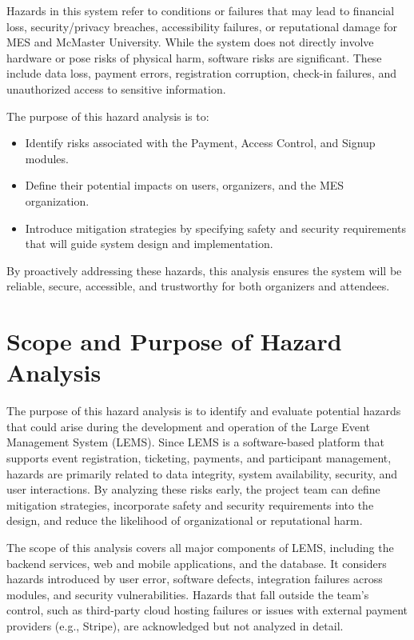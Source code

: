 \documentclass{article}
\begin{document}
\noindent
Hazards in this system refer to conditions or failures that may lead to financial loss, security/privacy breaches,
accessibility failures, or reputational damage for MES and McMaster University. While the system does not directly
involve hardware or pose risks of physical harm, software risks are significant. These include data loss, payment
errors, registration corruption, check-in failures, and unauthorized access to sensitive information.
\newline

\noindent
The purpose of this hazard analysis is to:

\begin{itemize}
    \item Identify risks associated with the Payment, Access Control, and Signup modules.
    \item Define their potential impacts on users, organizers, and the MES organization.
    \item Introduce mitigation strategies by specifying safety and security requirements that
     will guide system design and implementation.
\end{itemize}

\noindent
By proactively addressing these hazards, this analysis ensures the system will be reliable, secure, accessible, and trustworthy for both organizers and attendees.

\section{Scope and Purpose of Hazard Analysis}


The purpose of this hazard analysis is to identify and evaluate potential hazards that could arise during 
the development and operation of the Large Event Management System (LEMS). Since LEMS is a 
software-based platform that supports event registration, ticketing, payments, and participant 
management, hazards are primarily related to data integrity, system availability, security, and user 
interactions. By analyzing these risks early, the project team can define mitigation strategies, 
incorporate safety and security requirements into the design, and reduce the likelihood of 
organizational or reputational harm.

\par
\vspace{1em}

The scope of this analysis covers all major components of LEMS, including the backend services, 
web and mobile applications, and the database. It considers hazards introduced by user error, software 
defects, integration failures across modules, and security vulnerabilities. Hazards that fall outside the 
team’s control, such as third-party cloud hosting failures or issues with external payment providers 
(e.g., Stripe), are acknowledged but not analyzed in detail.
\end{document}
